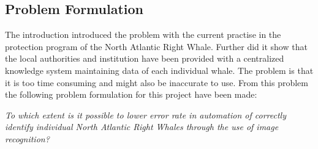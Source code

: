 \subsection{Problem Formulation}
The introduction introduced the problem with the current practise in the protection program of the North Atlantic Right Whale. Further did it show that the local authorities and institution have been provided with a centralized knowledge system maintaining data of each individual whale.
The problem is that it is too time consuming and might also be inaccurate to use.
From this problem the following problem formulation for this project have been made:

\begin{center}
\textit{To which extent is it possible to lower error rate in automation of correctly identify individual North Atlantic Right Whales through the use of image recognition?}
\end{center}